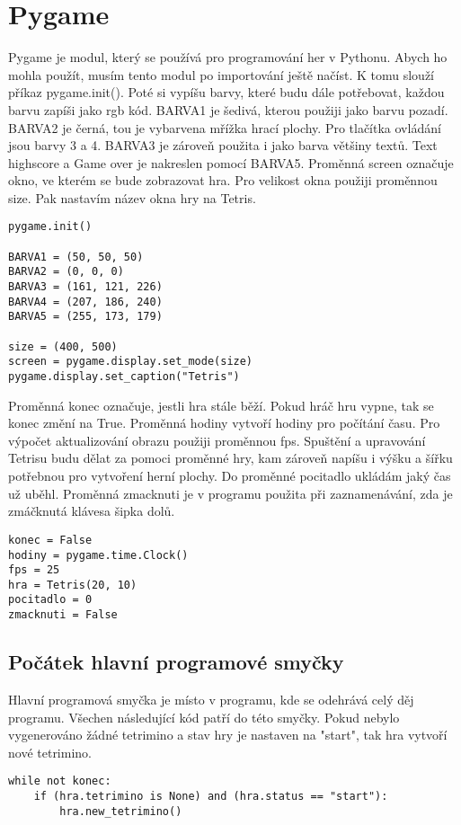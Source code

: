 \documentclass[12pt]{report}			%
\begin{document}
	\chapter{Pygame}
Pygame je modul, který se používá pro programování her v Pythonu. Abych ho mohla použít, musím tento modul po importování ještě načíst. K tomu slouží příkaz pygame.init(). Poté si vypíšu barvy, které budu dále potřebovat, každou barvu zapíši jako rgb kód. BARVA1 je šedivá, kterou použiji jako barvu pozadí. BARVA2 je černá, tou je vybarvena mřížka hrací plochy. Pro tlačítka ovládání jsou barvy 3 a 4. BARVA3 je zároveň použita i jako barva většiny textů. Text highscore a Game over je nakreslen pomocí BARVA5. Proměnná screen označuje okno, ve kterém se bude zobrazovat hra. Pro velikost okna použiji proměnnou size. Pak nastavím název okna hry na Tetris.\\
\begin{lstlisting}[title={Program tetris.py}, caption={Počátek Pygame}, 							label={lst:tetris.py}]
pygame.init()

BARVA1 = (50, 50, 50)
BARVA2 = (0, 0, 0)
BARVA3 = (161, 121, 226)
BARVA4 = (207, 186, 240)
BARVA5 = (255, 173, 179)

size = (400, 500)
screen = pygame.display.set_mode(size)
pygame.display.set_caption("Tetris")
\end{lstlisting}
Proměnná konec označuje, jestli hra stále běží. Pokud hráč hru vypne, tak se konec změní na True. Proměnná hodiny vytvoří hodiny pro počítání času. Pro výpočet aktualizování obrazu použiji proměnnou fps. Spuštění a upravování Tetrisu budu dělat za pomoci proměnné hry, kam zároveň napíšu i výšku a šířku potřebnou pro vytvoření herní plochy.
Do proměnné pocitadlo ukládám jaký čas už uběhl.
Proměnná zmacknuti je v programu použita při zaznamenávání, zda je zmáčknutá klávesa šipka dolů.
\begin{lstlisting}[title={Program tetris.py}, caption={Další proměnné pro Pygame}, 							label={lst:tetris.py}]
konec = False
hodiny = pygame.time.Clock()
fps = 25
hra = Tetris(20, 10)
pocitadlo = 0
zmacknuti = False
\end{lstlisting}
\section{Počátek hlavní programové smyčky}
Hlavní programová smyčka je místo v programu, kde se odehrává celý děj programu. Všechen následující kód patří do této smyčky.
Pokud nebylo vygenerováno žádné tetrimino a stav hry je nastaven na "start", tak hra vytvoří nové tetrimino.
\begin{lstlisting}[title={Program tetris.py}, caption={Počátek hlavní programové smyčky}, 							label={lst:tetris.py}]
while not konec:
    if (hra.tetrimino is None) and (hra.status == "start"):
        hra.new_tetrimino()
\end{lstlisting}
\end{document}
